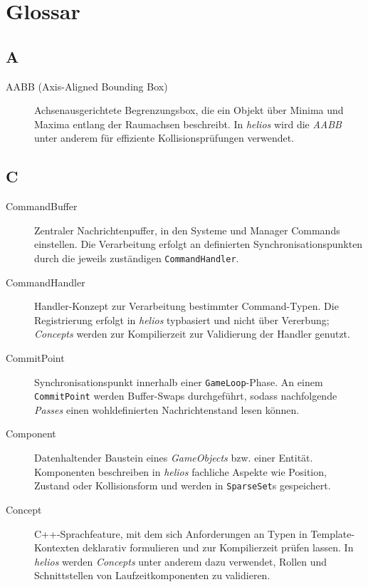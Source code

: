 \chapter{Glossar}\label{ch:glossar}

\section*{A}

\begin{description}
    \item[AABB (Axis-Aligned Bounding Box)] Achsenausgerichtete Begrenzungsbox, die ein Objekt über Minima und Maxima entlang der Raumachsen beschreibt.
    In \textit{helios} wird die \textit{AABB} unter anderem für effiziente Kollisionsprüfungen verwendet.
\end{description}

\section*{C}

\begin{description}
    \item[CommandBuffer] Zentraler Nachrichtenpuffer, in den Systeme und Manager Commands einstellen.
    Die Verarbeitung erfolgt an definierten Synchronisationspunkten durch die jeweils zuständigen \texttt{CommandHandler}.

    \item[CommandHandler] Handler-Konzept zur Verarbeitung bestimmter Command-Typen.
    Die Registrierung erfolgt in \textit{helios} typbasiert und nicht über Vererbung; \textit{Concepts} werden zur Kompilierzeit zur Validierung der Handler genutzt.

    \item[CommitPoint] Synchronisationspunkt innerhalb einer \texttt{GameLoop}-Phase.
    An einem \texttt{CommitPoint} werden Buffer-Swaps durchgeführt, sodass nachfolgende \textit{Passes} einen wohldefinierten Nachrichtenstand lesen können.

    \item[Component] Datenhaltender Baustein eines \textit{GameObjects} bzw. einer Entität.
    Komponenten beschreiben in \textit{helios} fachliche Aspekte wie Position, Zustand oder Kollisionsform und werden in \texttt{SparseSet}s gespeichert.

    \item[Concept] C++-Sprachfeature, mit dem sich Anforderungen an Typen in Template-Kontexten deklarativ formulieren und zur Kompilierzeit prüfen lassen.
    In \textit{helios} werden \textit{Concepts} unter anderem dazu verwendet, Rollen und Schnittstellen von Laufzeitkomponenten zu validieren.
\end{description}

